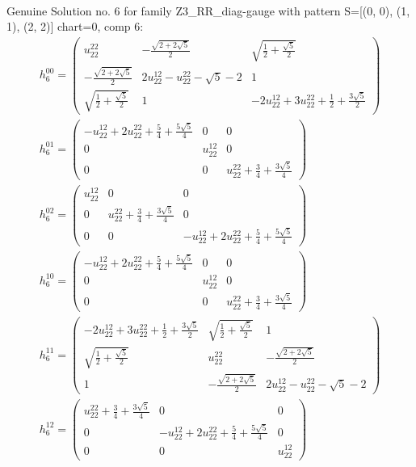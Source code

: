 \documentclass[a4paper, 11pt, twoside, onecolumn]{article}
\begin{document}
\begin{landscape}
\begin{gather*}
\end{gather*} 
Genuine Solution no. 6 for family Z3_RR_diag-gauge with pattern S=[(0, 0), (1, 1), (2, 2)] chart=0, comp 6: 
\begin{gather*} 
	 h_6^{00}=\begin{pmatrix}u^{22}_{22} & - \frac{\sqrt{2 + 2 \sqrt{5}}}{2} & \sqrt{\frac{1}{2} + \frac{\sqrt{5}}{2}}\\- \frac{\sqrt{2 + 2 \sqrt{5}}}{2} & 2 u^{12}_{22} - u^{22}_{22} - \sqrt{5} - 2 & 1\\\sqrt{\frac{1}{2} + \frac{\sqrt{5}}{2}} & 1 & - 2 u^{12}_{22} + 3 u^{22}_{22} + \frac{1}{2} + \frac{3 \sqrt{5}}{2}\end{pmatrix}\\ 
	 h_6^{01}=\begin{pmatrix}- u^{12}_{22} + 2 u^{22}_{22} + \frac{5}{4} + \frac{5 \sqrt{5}}{4} & 0 & 0\\0 & u^{12}_{22} & 0\\0 & 0 & u^{22}_{22} + \frac{3}{4} + \frac{3 \sqrt{5}}{4}\end{pmatrix}\\ 
	 h_6^{02}=\begin{pmatrix}u^{12}_{22} & 0 & 0\\0 & u^{22}_{22} + \frac{3}{4} + \frac{3 \sqrt{5}}{4} & 0\\0 & 0 & - u^{12}_{22} + 2 u^{22}_{22} + \frac{5}{4} + \frac{5 \sqrt{5}}{4}\end{pmatrix}\\ 
	 h_6^{10}=\begin{pmatrix}- u^{12}_{22} + 2 u^{22}_{22} + \frac{5}{4} + \frac{5 \sqrt{5}}{4} & 0 & 0\\0 & u^{12}_{22} & 0\\0 & 0 & u^{22}_{22} + \frac{3}{4} + \frac{3 \sqrt{5}}{4}\end{pmatrix}\\ 
	 h_6^{11}=\begin{pmatrix}- 2 u^{12}_{22} + 3 u^{22}_{22} + \frac{1}{2} + \frac{3 \sqrt{5}}{2} & \sqrt{\frac{1}{2} + \frac{\sqrt{5}}{2}} & 1\\\sqrt{\frac{1}{2} + \frac{\sqrt{5}}{2}} & u^{22}_{22} & - \frac{\sqrt{2 + 2 \sqrt{5}}}{2}\\1 & - \frac{\sqrt{2 + 2 \sqrt{5}}}{2} & 2 u^{12}_{22} - u^{22}_{22} - \sqrt{5} - 2\end{pmatrix}\\ 
	 h_6^{12}=\begin{pmatrix}u^{22}_{22} + \frac{3}{4} + \frac{3 \sqrt{5}}{4} & 0 & 0\\0 & - u^{12}_{22} + 2 u^{22}_{22} + \frac{5}{4} + \frac{5 \sqrt{5}}{4} & 0\\0 & 0 & u^{12}_{22}\end{pmatrix}\\ 

\end{gather*}
\end{landscape}
\end{document}

